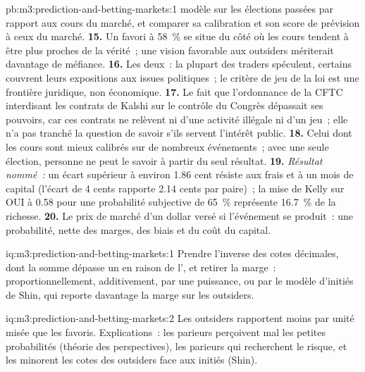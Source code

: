 \begin{solution}{pb:m3:prediction-and-betting-markets:1}
modèle sur les élections passées par rapport aux cours du marché, et comparer sa calibration et son score de prévision à ceux du marché. \textbf{15.} Un favori à 58~\% se situe du côté où
les cours tendent à être plus proches de la vérité~; une vision favorable aux outsiders mériterait davantage de méfiance. \textbf{16.} Les deux~: la plupart des traders spéculent, certains couvrent leurs expositions aux
issues politiques~; le critère de jeu de la loi est une frontière juridique, non économique. \textbf{17.} Le fait que l'ordonnance de la CFTC interdisant les contrats de Kalshi sur le contrôle du Congrès
dépassait ses pouvoirs, car ces contrats ne relèvent ni d'une activité illégale ni d'un jeu~; elle n'a pas tranché la question de savoir s'ils servent l'intérêt public.
\textbf{18.} Celui dont les cours sont mieux calibrés sur de nombreux événements~; avec une seule élection, personne ne peut le savoir à partir du seul résultat. \textbf{19.}
\emph{Résultat nommé~:} un écart supérieur à environ 1.86 cent résiste aux frais et à un mois de capital (l'écart de 4 cents rapporte 2.14 cents par paire)~; la mise de Kelly sur OUI à
0.58 pour une probabilité subjective de 65~\% représente 16.7~\% de la richesse. \textbf{20.} Le prix de marché d'un dollar versé si l'événement se produit~: une probabilité, nette des marges, des biais et
du coût du capital.
\end{solution}

\begin{solution}{iq:m3:prediction-and-betting-markets:1}
Prendre l'inverse des cotes décimales, dont la somme dépasse un en raison de l', et retirer la marge~: proportionnellement, additivement, par une puissance, ou par le modèle d'initiés de
Shin, qui reporte davantage la marge sur les outsiders.
\end{solution}

\begin{solution}{iq:m3:prediction-and-betting-markets:2}
Les outsiders rapportent moins par unité misée que les favoris. Explications~: les parieurs perçoivent mal les petites probabilités (théorie des perspectives), les parieurs qui recherchent le risque, et
les  minorent les cotes des outsiders face aux initiés (Shin).
\end{solution}

